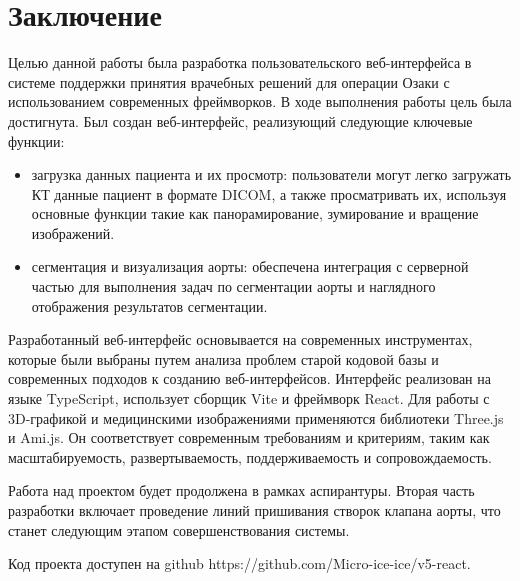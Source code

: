 \chapter*{Заключение}

Целью данной работы была разработка пользовательского веб-интерфейса в системе поддержки принятия врачебных решений для операции Озаки с использованием современных фреймворков. В ходе выполнения работы цель была достигнута. Был создан веб-интерфейс, реализующий следующие ключевые функции:

\begin{itemize}
    \item загрузка данных пациента и их просмотр: пользователи могут легко загружать КТ данные пациент в формате DICOM, а также просматривать их, используя основные функции такие как панорамирование, зумирование и вращение изображений.
    \item сегментация и визуализация аорты: обеспечена интеграция с серверной частью для выполнения задач по сегментации аорты и наглядного отображения результатов сегментации.
\end{itemize}

Разработанный веб-интерфейс основывается на современных инструментах, которые были выбраны путем анализа проблем старой кодовой базы и современных подходов к созданию веб-интерфейсов. Интерфейс реализован на языке TypeScript, использует сборщик Vite и фреймворк React. Для работы с 3D-графикой и медицинскими изображениями применяются библиотеки Three.js и Ami.js. Он соответствует современным требованиям и критериям, таким как масштабируемость, развертываемость, поддерживаемость и сопровождаемость.

Работа над проектом будет продолжена в рамках аспирантуры. Вторая часть разработки включает проведение линий пришивания створок клапана аорты, что станет следующим этапом совершенствования системы.

Код проекта доступен на github https://github.com/Micro-ice-ice/v5-react.

